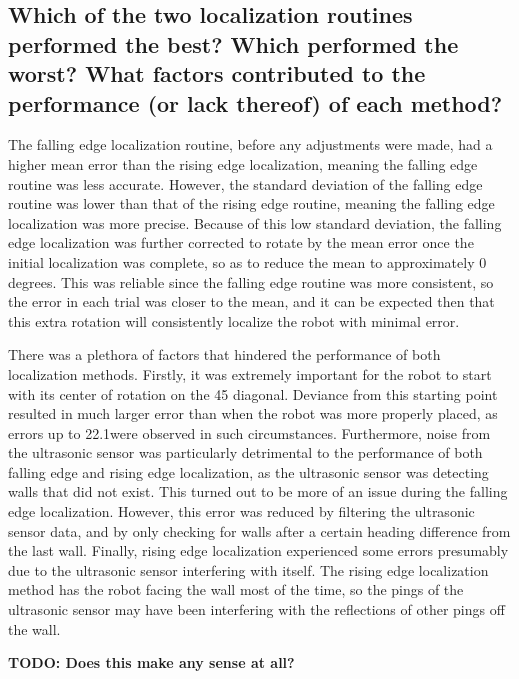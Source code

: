 \documentclass[11pt]{article}
\begin{document}
\subsection{Which of the two localization routines performed the best? Which performed the worst?
What factors contributed to the performance (or lack thereof) of each method?}
\par The falling edge localization routine, before any adjustments were made, had a higher mean error
than the rising edge localization, meaning the falling edge routine was less accurate. However, the
standard deviation of the falling edge routine was lower than that of the rising edge routine,
meaning the falling edge localization was more precise. Because of this low standard deviation, the
falling edge localization was further corrected to rotate by the mean error once the initial
localization was complete, so as to reduce the mean to approximately 0 degrees. This was reliable
since the falling edge routine was more consistent, so the error in each trial was closer to the
mean, and it can be expected then that this extra rotation will consistently localize the robot with
minimal error. \\

\par
There was a plethora of factors that hindered the performance of both localization methods. Firstly,
it was extremely important for the robot to start with its center of rotation on the 45\degree 
 diagonal. Deviance from this starting point resulted in much larger error than when the robot was
more properly placed, as errors up to 22.1\degree  were observed in such circumstances. Furthermore,
noise from the ultrasonic sensor was particularly detrimental to the performance of both falling
edge and rising edge localization, as the ultrasonic sensor was detecting walls that did not exist.
This turned out to be more of an issue during the falling edge localization. However, this error was
reduced by filtering the ultrasonic sensor data, and by only checking for walls after a certain
heading difference from the last wall. Finally, rising edge localization experienced some errors
presumably due to the ultrasonic sensor interfering with itself. The rising edge localization method
has the robot facing the wall most of the time, so the pings of the ultrasonic sensor may have been
interfering with the reflections of other pings off the wall.

\textbf{TODO: Does this make any sense at all?}
\end{document}
